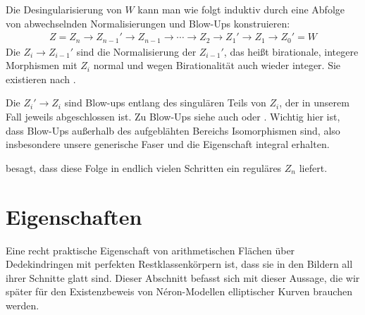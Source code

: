 \begin{Bemerkung}\label{bem:konstruktioneigmodell}
  Die Desingularisierung von $W$ kann man wie folgt induktiv durch
  eine Abfolge von abwechselnden Normalisierungen und Blow-Ups
  konstruieren:
  \begin{gather*}
    Z=Z_{n}\to Z_{n-1}'\to Z_{n-1}\to\dotsb
    \to Z_{2}\to Z_{1}'\to Z_{1}\to Z_{0}'=W
  \end{gather*}
  Die $Z_i\to Z_{i-1}'$ sind die Normalisierung der $Z_{i-1}'$,
  das heißt birationale, integere Morphismen mit $Z_{i}$ normal
  und wegen Birationalität auch wieder integer. Sie existieren nach
  \cite[Proposition 4.1.22]{liu}.
  
  Die $Z_{i}'\to Z_{i}$ sind Blow-ups entlang des singulären Teils von
  $Z_{i}$, der in unserem Fall jeweils abgeschlossen ist.
  Zu Blow-Ups siehe auch
  \cite[Chapter 8.1]{liu} oder \cite[Chapter 13.19]{wedhorn}.
  Wichtig hier ist, dass Blow-Ups außerhalb des aufgeblähten Bereichs
  Isomorphismen sind, also insbesondere unsere generische Faser und
  die Eigenschaft integral erhalten.

  \cite[Corollary 8.3.51]{liu} besagt, dass diese Folge in endlich
  vielen Schritten ein reguläres $Z_{n}$ liefert.
\end{Bemerkung}

\section{Eigenschaften}
Eine recht praktische Eigenschaft von arithmetischen Flächen über
Dedekindringen mit perfekten Restklassenkörpern ist, dass
sie in den Bildern all ihrer Schnitte glatt sind.
Dieser Abschnitt befasst sich mit dieser Aussage, die wir später für
den Existenzbeweis von Néron-Modellen elliptischer Kurven brauchen
werden.

